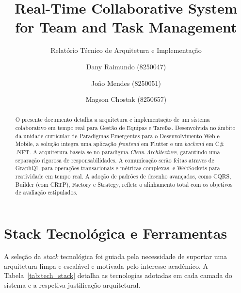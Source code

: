 \documentclass{llncs}
\begin{document}
\title{Real-Time Collaborative System for Team and Task Management}
\subtitle{Relatório Técnico de Arquitetura e Implementação}

\author{Dany Raimundo (8250047) \and João Mendes (8250051) \and Magson Chostak (8250657)}

\maketitle

\begin{abstract}
O presente documento detalha a arquitetura e implementação de um sistema colaborativo em tempo real para Gestão de Equipas e Tarefas. Desenvolvida no âmbito da unidade curricular de Paradigmas Emergentes para o Desenvolvimento Web e Mobile, a solução integra uma aplicação \textit{frontend} em Flutter e um \textit{backend} em C\# .NET. A arquitetura baseia-se no paradigma \textit{Clean Architecture}, garantindo uma separação rigorosa de responsabilidades. A comunicação serão feitas atraves de GraphQL para operações transacionais e métricas complexas, e WebSockets para reatividade em tempo real. A adoção de padrões de desenho avançados, como CQRS, Builder (com CRTP), Factory e Strategy, reflete o alinhamento total com os objetivos de avaliação estipulados.
\end{abstract}

\newpage

\section{Stack Tecnológica e Ferramentas}
A seleção da \textit{stack} tecnológica foi guiada pela necessidade de suportar uma arquitetura limpa e escalável e motivada pelo interesse académico. A Tabela~\ref{tab:tech_stack} detalha as tecnologias adotadas em cada camada do sistema e a respetiva justificação arquitetural.
\end{document}

